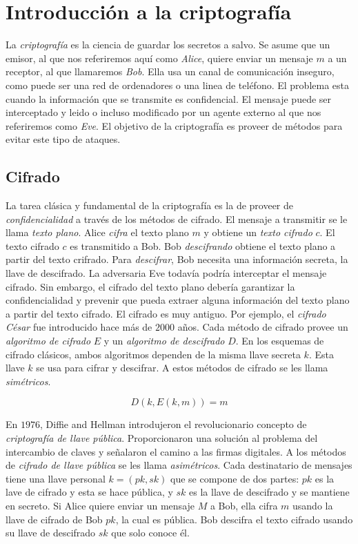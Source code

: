 \documentclass[12pt]{article}
\theoremstyle{definition}
\begin{document}
\section{Introducción a la criptografía}

La \textit{criptografía} es la ciencia de guardar los secretos a salvo. Se asume que un emisor, al que nos referiremos aquí como \textit{Alice}, quiere enviar un mensaje $m$ a un receptor, al que llamaremos \textit{Bob}. Ella usa un canal de comunicación inseguro, como puede ser una red de ordenadores o una linea de teléfono. El problema esta cuando la información que se transmite es confidencial. El mensaje puede ser interceptado y leido o incluso modificado por un agente externo al que nos referiremos como \textit{Eve}. El objetivo de la criptografía es proveer de métodos para evitar este tipo de ataques.

\subsection{Cifrado}

La tarea clásica y fundamental de la criptografía es la de proveer de \textit{confidencialidad} a través de los métodos de cifrado. El mensaje a transmitir se le llama \textit{texto plano}. Alice \textit{cifra} el texto plano $m$ y obtiene un \textit{texto cifrado} $c$. El texto cifrado $c$ es transmitido a Bob. Bob \textit{descifrando} obtiene el texto plano a partir del texto crifrado. Para \textit{descifrar}, Bob necesita una información secreta, la llave de descifrado. La adversaria Eve todavía podría interceptar el mensaje cifrado. Sin embargo, el cifrado del texto plano debería garantizar la confidencialidad y prevenir que pueda extraer alguna información del texto plano a partir del texto cifrado.
\newline
\newline
El cifrado es muy antiguo. Por ejemplo, el \textit{cifrado César} fue introducido hace más de $2000$ años. Cada método de cifrado provee un \textit{algoritmo de cifrado} $E$ y un \textit{algoritmo de descifrado} $D$. En los esquemas de cifrado clásicos, ambos algoritmos dependen de la misma llave secreta $k$. Esta llave $k$ se usa para cifrar y descifrar. A estos métodos de cifrado se les llama \textit{simétricos}.

$$D(k,E(k,m))=m$$

En $1976$, Diffie and Hellman introdujeron el revolucionario concepto de \textit{criptografía de llave pública}. Proporcionaron una solución al problema del intercambio de claves y señalaron el camino a las firmas digitales. A los métodos de \textit{cifrado de llave pública} se les llama \textit{asimétricos}. Cada destinatario de mensajes tiene una llave personal $k = (pk,sk)$ que se compone de dos partes: $pk$ es la lave de cifrado y esta se hace pública, y $sk$ es la llave de descifrado y se mantiene en secreto. Si Alice quiere enviar un mensaje $M$ a Bob, ella cifra $m$ usando la llave de cifrado de Bob $pk$, la cual es pública. Bob descifra el texto cifrado usando su llave de descifrado $sk$ que solo conoce él.
\end{document}

